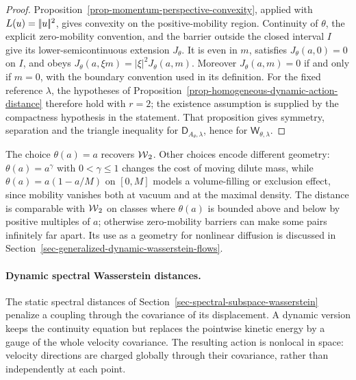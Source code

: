 \begin{proof}
	Proposition~\ref{prop-momentum-perspective-convexity}, applied with \(L(u)=|\!| u |\!|^2\), gives convexity on the positive-mobility region. Continuity of $\theta$, the explicit zero-mobility convention, and the barrier outside the closed interval $I$ give its lower-semicontinuous extension $J_\theta$. It is even in \(m\), satisfies \(J_\theta(a,0)=0\) on $I$, and obeys
	\(J_\theta(a,\xi m)=|\xi|^2J_\theta(a,m)\).
	Moreover \(J_\theta(a,m)=0\) if and only if \(m=0\), with the boundary convention used in its definition. For the fixed reference \(\lambda\), the hypotheses of Proposition~\ref{prop-homogeneous-dynamic-action-distance} therefore hold with \(r=2\); the existence assumption is supplied by the compactness hypothesis in the statement. That proposition gives symmetry, separation and the triangle inequality for \(\mathsf D_{A_\theta,\lambda}\), hence for \(\mathsf W_{\theta,\lambda}\).
\end{proof}

The choice $\theta(a)=a$ recovers $\operatorname{\mathcal{W}}_2$. Other choices encode different geometry: $\theta(a)=a^\gamma$ with $0<\gamma\leq1$ changes the cost of moving dilute mass, while $\theta(a)=a(1-a/M)$ on $[0,M]$ models a volume-filling or exclusion effect, since mobility vanishes both at vacuum and at the maximal density. The distance is comparable with $\operatorname{\mathcal{W}}_2$ on classes where $\theta(a)$ is bounded above and below by positive multiples of $a$; otherwise zero-mobility barriers can make some pairs infinitely far apart. Its use as a geometry for nonlinear diffusion is discussed in Section~\ref{sec-generalized-dynamic-wasserstein-flows}.

\paragraph{Dynamic spectral Wasserstein distances.}
The static spectral distances of Section~\ref{sec-spectral-subspace-wasserstein} penalize a coupling through the covariance of its displacement. A dynamic version keeps the continuity equation but replaces the pointwise kinetic energy by a gauge of the whole velocity covariance. The resulting action is nonlocal in space: velocity directions are charged globally through their covariance, rather than independently at each point.

